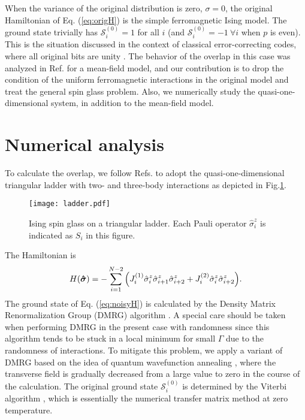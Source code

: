 \documentclass[aps,pra,twocolumn,groupedaddress,longbibliography]{revtex4}
\def\v#1{\mbox{\boldmath $#1$}}
\newcommand{\Sig}{\sigma}
\begin{document}
When the variance of the original distribution is zero, $\sigma = 0$, the original Hamiltonian of Eq. (\ref{eq:origH}) is the simple ferromagnetic Ising model.  The ground state trivially has $\mathcal{S}^{(0)}_i=1$  for all $i$ (and  $\mathcal{S}^{(0)}_i=-1 ~\forall i$ when $p$ is even).  This is the situation discussed in the context of classical error-correcting codes, where all original bits are unity \cite{nsmrbook}. The behavior of the overlap in this case was analyzed in Ref. \cite{Otsubo2012} for a mean-field model, and our contribution is to drop the condition of the uniform ferromagnetic interactions in the original model and treat the general spin glass problem. Also, we numerically study the quasi-one-dimensional system, in addition to the mean-field model.


\section{Numerical analysis} 
\label{sec:numericalresult}
To calculate the overlap, we follow Refs. \cite{rujan1993,Nishimura2016} to adopt the quasi-one-dimensional triangular ladder with two- and three-body interactions as depicted in Fig.\ref{fig:ladder}. 
\begin{figure}
	\centering
	\texttt{[image: ladder.pdf]}
	\caption{Ising spin glass on a triangular ladder. Each Pauli operator $\hat{\Sig}_i^{z}$ is indicated as $S_i$ in this figure.}
	\label{fig:ladder}
\end{figure}
The Hamiltonian is
\begin{align}
	\label{eq:ladder}
	H(\v{\hat{\Sig}}) = -\sum_{i=1}^{N-2}\Big(J_i^{(1)}\hat{\Sig}_{i}^{z}\hat{\Sig}_{i+1}^{z}\hat{\Sig}_{i+2}^{z}+J_i^{(2)}\hat{\Sig}_{i}^{z}\hat{\Sig}_{i+2}^{z}\Big).
\end{align}
The ground state of Eq. (\ref{eq:noisyH}) is calculated by the Density Matrix Renormalization Group (DMRG) algorithm \cite{White1992,White1993}. A special care should be taken when performing DMRG in the present case with randomness since this algorithm tends to be stuck in a local minimum for small $\Gamma$ due to the randomness of interactions. To mitigate this problem, we apply a variant of DMRG based on the idea of quantum wavefunction annealing \cite{Rodriguez-Laguna2007, Rodriguez-Laguna2014}, where the transverse field is gradually decreased from a large value to zero in the course of the calculation. The original ground state $\mathcal{S}^{(0)}_i$ is determined by  the Viterbi algorithm \cite{viterbi1967}, which is essentially the numerical transfer matrix method at zero temperature.
\end{document}
